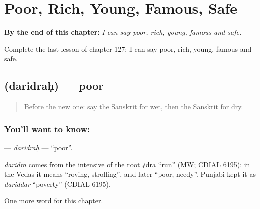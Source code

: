 
\chapter{Poor, Rich, Young, Famous, Safe}
\label{ch:sa-poor-rich-young-famous-safe}

\begin{chapteropening}
\textbf{By the end of this chapter:} \emph{I can say poor, rich, young, famous and safe.}

Complete the last lesson of chapter 127: I can say poor, rich, young, famous and safe.
\end{chapteropening}

\section[\texorpdfstring{\sk{दरिद्रः} (daridraḥ)}{दरिद्रः (daridraḥ)}]{ (daridraḥ) — poor}

\label{lesson:SA-C127-daridrah}



\begin{quote}
Before the new one: say the Sanskrit for wet, then the Sanskrit for dry.
\end{quote}

\subsection*{You'll want to know: }
\textbf{} — \emph{daridraḥ} — \textquotedblleft{}poor\textquotedblright{}.

\begin{cousinweb}
\emph{daridra} comes from the intensive of the root √drā \textquotedblleft{}run\textquotedblright{} (MW; CDIAL 6195): in the Vedas it means \textquotedblleft{}roving, strolling\textquotedblright{}, and later \textquotedblleft{}poor, needy\textquotedblright{}. Punjabi kept it as \emph{dariddar} \textquotedblleft{}poverty\textquotedblright{} (CDIAL 6195).
\end{cousinweb}

\begin{grammarlens}[title={What you've built}]
One more word for this chapter.
\end{grammarlens}


